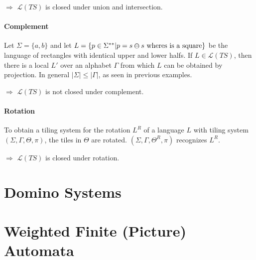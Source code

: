 \documentclass{article}
\begin{document}
$\Rightarrow$ $\mathcal{L}(TS)$ is closed under union and intersection.

\paragraph{Complement} Let $\Sigma = \{a,b\}$ and let $L = \{p \in \Sigma^{**} | p = s\varominus s \textrm{ wheres is a square}\}$ be the language of rectangles with identical upper and lower halfs. If $L \in \mathcal{L}(TS)$, then there is a local $L'$ over an alphabet $\Gamma$ from which $L$ can be obtained by projection. In general $|\Sigma| \leq |\Gamma|$, as seen in previous examples. 


$\Rightarrow$ $\mathcal{L}(TS)$ is not closed under complement.

\paragraph{Rotation} To obtain a tiling system for the rotation $L^R$ of a language $L$ with tiling system $(\Sigma, \Gamma, \Theta, \pi)$, the tiles in $\Theta$ are rotated. $(\Sigma, \Gamma, \Theta^R, \pi)$ recognizes $L^R$.


$\Rightarrow$ $\mathcal{L}(TS)$ is closed under rotation.

\section{Domino Systems}



\section{Weighted Finite (Picture) Automata}





\newpage
\nocite{*}


\end{document}
